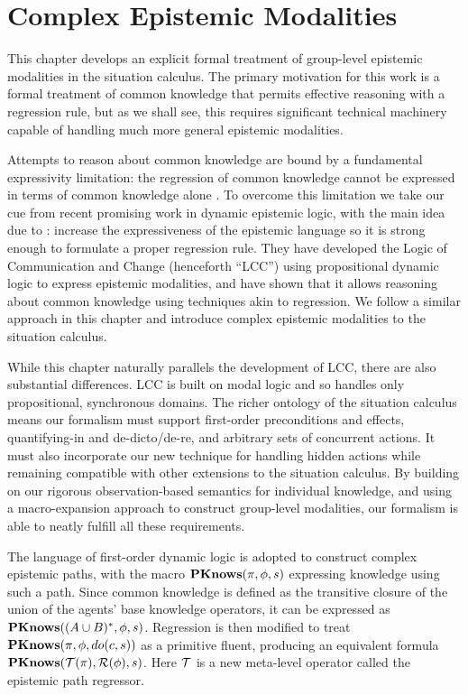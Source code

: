 

\chapter{Complex Epistemic Modalities}

\label{ch:cknowledge}

This chapter develops an explicit formal treatment of group-level
epistemic modalities in the situation calculus. The primary motivation
for this work is a formal treatment of common knowledge that permits
effective reasoning with a regression rule, but as we shall see, this
requires significant technical machinery capable of handling much
more general epistemic modalities.

Attempts to reason about common knowledge are bound by a fundamental
expressivity limitation: the regression of common knowledge cannot
be expressed in terms of common knowledge alone \citep{baltag98pa_ck}.
To overcome this limitation we take our cue from recent promising
work in dynamic epistemic logic, with the main idea due to \citet{vanBenthem06lcc}:
increase the expressiveness of the epistemic language so it is strong
enough to formulate a proper regression rule. They have developed
the Logic of Communication and Change (henceforth {}``LCC'') using
propositional dynamic logic to express epistemic modalities, and have
shown that it allows reasoning about common knowledge using techniques
akin to regression. We follow a similar approach in this chapter and
introduce complex epistemic modalities to the situation calculus.

While this chapter naturally parallels the development of LCC, there
are also substantial differences. LCC is built on modal logic and
so handles only propositional, synchronous domains. The richer ontology
of the situation calculus means our formalism must support first-order
preconditions and effects, quantifying-in and de-dicto/de-re, and
arbitrary sets of concurrent actions. It must also incorporate our
new technique for handling hidden actions while remaining compatible
with other extensions to the situation calculus. By building on our
rigorous observation-based semantics for individual knowledge, and
using a macro-expansion approach to construct group-level modalities,
our formalism is able to neatly fulfill all these requirements.

The language of first-order dynamic logic is adopted to construct
complex epistemic paths, with the macro $\mathbf{PKnows}(\pi,\phi,s)$ expressing
knowledge using such a path. Since common knowledge is defined as
the transitive closure of the union of the agents' base knowledge
operators, it can be expressed as $\mathbf{PKnows}((A\cup B)^{*},\phi,s)$.
Regression is then modified to treat $\mathbf{PKnows}(\pi,\phi,do(c,s))$
as a primitive fluent, producing an equivalent formula $\mathbf{PKnows}(\mathcal{T}(\pi),\mathcal{R}(\phi),s)$.
Here $\mathcal{T}$ is a new meta-level operator called the epistemic path
regressor.


